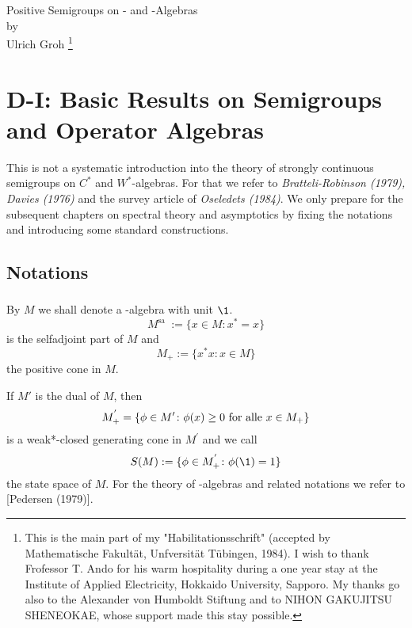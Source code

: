 \documentclass[%
,parskip = full
,english
,fontsize = 12pt]
	{scrartcl}
\begin{document}

\thispagestyle{empty}

\begin{center}


{\huge Positive Semigroups on \CA- and \WA-Algebras}\\[.5cm]
by\\[.5cm]
Ulrich Groh%
\footnote{This is the main part of my "Habilitationsschrift" (accepted by Mathematische Fakultät, Unfversität Tübingen, 1984). I wish to thank Frofessor T. Ando for his warm hospitality during a one year stay at the Institute of Applied Electricity, Hokkaido University, Sapporo. My thanks go also to the Alexander von Humboldt Stiftung and to NIHON GAKUJITSU SHENEOKAE, whose support made this stay possible.}
\end{center}

\section*{D-I: Basic Results on Semigroups and Operator Algebras}

This is not a systematic introduction into the theory of strongly continuous semigroups on $C^{*}$ and $W^{*}$-algebras. 
For that we refer to \emph{Bratteli-Robinson (1979), Davies (1976)} and the survey article of \emph{Oseledets (1984)}. 
We only prepare for the subsequent chapters on spectral theory and asymptotics by fixing the notations and introducing some standard constructions.
\setcounter{section}{1}
\subsection{Notations}
\subsubsection{}
By $M$ we shall denote a \CA-algebra with unit $ \1 $. 
%
\[
	M^{ \text {sa } } := \{ x \in M  \colon  x^{*}=x \}
\]
%
is the selfadjoint part of $M$ and %
\[
	M_{+}:= \{ x^{*} x \colon x \in M \} 
\]
%
the positive cone in $M$.

If $ M' $ is the dual of $ M $, then 
%
\[
	M^{'}_{+} = \{ \phi \in M' \colon \phi(x) \geq 0 \text{ for alle $ x \in M_{+} $} \} 
\]
%
is a weak*-closed generating cone in $M^{\prime}$ and we call
%
\[
	S(M):= \{\phi \in M^{'}_{+} \colon \phi(\1) = 1 \} 
\]
%
the state space of $M$. 
For the theory of \CA-algebras and related notations we refer to [Pedersen (1979)].
\end{document}
